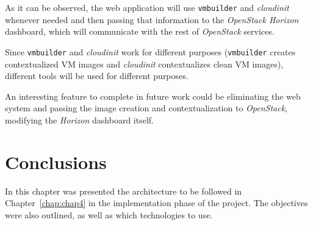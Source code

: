 As it can be observed, the web application will use \texttt{vmbuilder} and \textit{cloudinit} whenever needed and then passing that information to the \textit{OpenStack Horizon} dashboard, which will communicate with the rest of \textit{OpenStack} services.

Since \texttt{vmbuilder} and \textit{cloudinit} work for different purposes (\texttt{vmbuilder} creates contextualized VM images and \textit{cloudinit} contextualizes clean VM images), different tools will be used for different purposes.



An interesting feature to complete in future work could be eliminating the web system and passing the image creation and contextualization to \textit{OpenStack}, modifying the \textit{Horizon} dashboard itself.
 


\section{Conclusions}

In this chapter was presented the architecture to be followed in Chapter~\ref{chap:chap4} in the implementation phase of the project. The objectives were also outlined, as well as which technologies to use.
